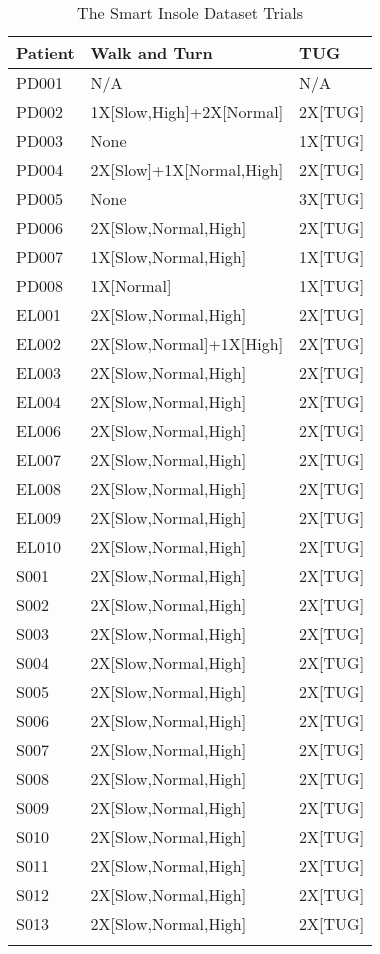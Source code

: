 \begin{longtable} [h!]{|>{\centering}m{2cm} |>{\centering}m{6cm} | >{\centering}m{3.5cm} |}
    \hline
     \textbf{Patient}   &  \textbf{Walk and Turn}   &  \textbf{TUG}  \tabularnewline
    \hline
    PD001 & N/A & N/A \tabularnewline
    \hline
    PD002&1X[Slow,High]+2X[Normal] &2X[TUG]\tabularnewline
    \hline
    PD003&None &1X[TUG]\tabularnewline
    \hline
    PD004&2X[Slow]+1X[Normal,High] &2X[TUG]\tabularnewline
    \hline
    PD005&None&3X[TUG]\tabularnewline
    \hline
    PD006&2X[Slow,Normal,High]&2X[TUG]\tabularnewline
    \hline
    PD007&1X[Slow,Normal,High]&1X[TUG]\tabularnewline
    \hline
    PD008&1X[Normal]&1X[TUG]\tabularnewline
    \hline
    EL001&2X[Slow,Normal,High]&2X[TUG]\tabularnewline
    \hline
   EL002&2X[Slow,Normal]+1X[High] &2X[TUG]\tabularnewline
    \hline
    EL003	  &2X[Slow,Normal,High]     &2X[TUG]\tabularnewline
    \hline
    EL004	  &2X[Slow,Normal,High]     &2X[TUG]\tabularnewline
    \hline
    EL006	  &2X[Slow,Normal,High]     &2X[TUG]\tabularnewline
    \hline
    EL007	  &2X[Slow,Normal,High]     &2X[TUG]\tabularnewline
    \hline
    EL008    &2X[Slow,Normal,High]     &2X[TUG]\tabularnewline
    \hline
    EL009	  &2X[Slow,Normal,High]     &2X[TUG]\tabularnewline
    \hline
   EL010	  &2X[Slow,Normal,High]     &2X[TUG]\tabularnewline
    \hline
    S001	  &2X[Slow,Normal,High]     &2X[TUG]\tabularnewline
    \hline
    S002	  &2X[Slow,Normal,High]     &2X[TUG]\tabularnewline
    \hline
    S003	  &2X[Slow,Normal,High]     &2X[TUG]\tabularnewline
    \hline
    S004	  &2X[Slow,Normal,High]     &2X[TUG]\tabularnewline
    \hline
    S005	  &2X[Slow,Normal,High]     &2X[TUG]\tabularnewline
    \hline
   S006	  &2X[Slow,Normal,High]     &2X[TUG]\tabularnewline
    \hline
   S007	  &2X[Slow,Normal,High]     &2X[TUG]\tabularnewline
    \hline
    S008	  &2X[Slow,Normal,High]     &2X[TUG]\tabularnewline
    \hline
    S009	  &2X[Slow,Normal,High]     &2X[TUG]\tabularnewline
    \hline
    S010	  &2X[Slow,Normal,High]     &2X[TUG]\tabularnewline
    \hline
    S011	  &2X[Slow,Normal,High]     &2X[TUG]\tabularnewline
    \hline
    S012	  &2X[Slow,Normal,High]     &2X[TUG]\tabularnewline
    \hline
    S013	  &2X[Slow,Normal,High]     &2X[TUG]\tabularnewline
    \hline
\caption{The Smart Insole Dataset Trials}
\label{tab:SmartInsoleTrials}
\end{longtable}